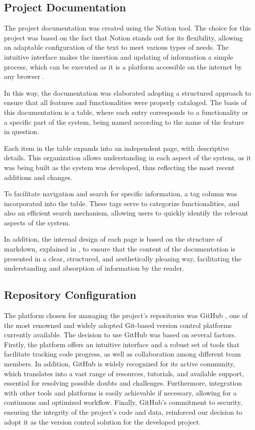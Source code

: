 \subsection{Project Documentation}\label{sec:documentation}
The project documentation was created using the Notion tool. The choice for this project was based on the fact that Notion stands out for its flexibility, allowing an adaptable configuration of the text to meet various types of needs. The intuitive interface makes the insertion and updating of information a simple process, which can be executed as it is a platform accessible on the internet by any browser \cite{notionProjectManagement}.

In this way, the documentation was elaborated adopting a structured approach to ensure that all features and functionalities were properly cataloged. The basis of this documentation is a table, where each entry corresponds to a functionality or a specific part of the system, being named according to the name of the feature in question.

Each item in the table expands into an independent page, with descriptive details. This organization allows understanding in each aspect of the system, as it was being built as the system was developed, thus reflecting the most recent additions and changes.

To facilitate navigation and search for specific information, a tag column was incorporated into the table. These tags serve to categorize functionalities, and also an efficient search mechanism, allowing users to quickly identify the relevant aspects of the system.

In addition, the internal design of each page is based on the structure of markdown, explained in \cite{markdownguide}, to ensure that the content of the documentation is presented in a clear, structured, and aesthetically pleasing way, facilitating the understanding and absorption of information by the reader.

\subsection{Repository Configuration}
The platform chosen for managing the project's repositories was GitHub \cite{github}, one of the most renowned and widely adopted Git-based version control platforms currently available. The decision to use GitHub was based on several factors. Firstly, the platform offers an intuitive interface and a robust set of tools that facilitate tracking code progress, as well as collaboration among different team members. In addition, GitHub is widely recognized for its active community, which translates into a vast range of resources, tutorials, and available support, essential for resolving possible doubts and challenges. Furthermore, integration with other tools and platforms is easily achievable if necessary, allowing for a continuous and optimized workflow. Finally, GitHub's commitment to security, ensuring the integrity of the project's code and data, reinforced our decision to adopt it as the version control solution for the developed project.

